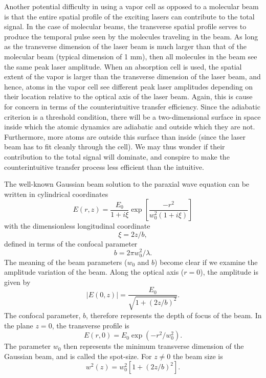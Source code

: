 \hspace{\parindent}  Another potential difficulty in using a vapor cell as
opposed to a molecular beam is that the entire spatial profile of the exciting
lasers can contribute to the total signal.  In the case of molecular beams, the
transverse spatial profile serves to produce the temporal pulse seen by the
molecules traveling in the beam.  As long as the transverse dimension of the
laser beam is much larger than that of the molecular beam (typical dimension
of 1 mm), then all molecules in the beam see the same peak laser amplitude. 
When an absorption cell is used, the spatial extent of the vapor is larger than
the transverse dimension of the laser beam, and hence, atoms in the vapor cell
see different peak laser amplitudes depending on their location relative to
the optical axis of the laser beam.  Again, this is cause for concern in terms
of the counterintuitive transfer efficiency.  Since the adiabatic criterion is
a threshold condition, there will be a two-dimensional surface in space inside
which the atomic dynamics are adiabatic and outside which they are not. 
Furthermore, more atoms are outside this surface than inside (since the laser
beam has to fit cleanly through the cell).  We may thus wonder if their
contribution to the total signal will dominate, and conspire to make the
counterintuitive transfer process less efficient than the intuitive.

The well-known Gaussian beam solution to the paraxial wave equation can be
written in cylindrical coordinates \cite{Boyd_book2}
\begin{equation}
E(r,z) = \frac{E_0}{1 + i\xi}\exp\left[\frac{-r^2}{w_0^2(1 + i\xi)}\right]
\end{equation}
with the dimensionless longitudinal coordinate
\begin{equation}
\xi = 2z/b,
\end{equation}
defined in terms of the confocal parameter
\begin{equation}
b = 2 \pi w_0^2/\lambda.
\end{equation}
The meaning of the beam parameters ($w_0$ and $b$) become clear if we examine
the amplitude variation of the beam.  Along the optical axis ($r = 0$), the
amplitude is given by
\begin{equation}
\left|E(0,z)\right| = \frac{E_0}{\sqrt{1 +(2z/b)^2}}.
\end{equation}
The confocal parameter, $b$, therefore represents the depth of focus of the
beam.  In the plane $z=0$, the transverse profile is
\begin{equation}
E(r,0) = E_0 \exp\left(-r^2/w_0^2\right).
\label{gaussian}
\end{equation}
The parameter $w_0$ then represents the minimum transverse dimension of
the Gaussian beam, and is called the spot-size. For $z \neq 0$ the beam size is
\begin{equation}
w^2(z) = w_0^2 \left[ 1 + (2z/b)^2\right].
\end{equation} 

